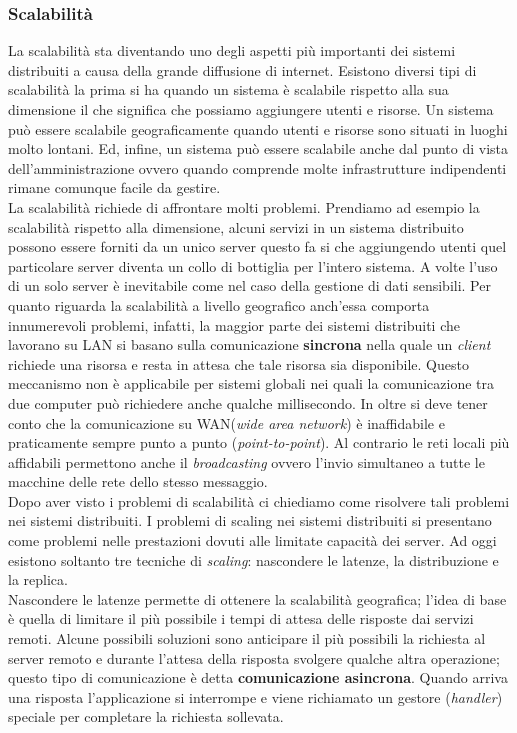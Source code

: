 \subsubsection{Scalabilità}
La scalabilità sta diventando uno degli aspetti più importanti dei sistemi distribuiti a causa della grande diffusione di internet. Esistono diversi tipi di scalabilità la prima si ha quando un sistema è scalabile rispetto alla sua dimensione il che significa che possiamo aggiungere utenti e risorse. Un sistema può essere scalabile geograficamente quando utenti e risorse sono situati in luoghi molto lontani.
Ed, infine, un sistema può essere scalabile anche dal punto di vista dell'amministrazione ovvero quando comprende molte infrastrutture indipendenti rimane comunque facile da gestire.\\
La scalabilità richiede di affrontare molti problemi. Prendiamo ad esempio la scalabilità rispetto alla dimensione, alcuni servizi in un sistema distribuito possono essere forniti da un unico server questo fa si che aggiungendo utenti quel particolare server diventa un collo di bottiglia per l'intero sistema. A volte l'uso di un solo server è inevitabile come nel caso della gestione di dati sensibili.
Per quanto riguarda la scalabilità a livello geografico anch'essa comporta innumerevoli problemi, infatti, la maggior parte dei sistemi distribuiti che lavorano su LAN si basano sulla comunicazione \textbf{sincrona} nella quale un \emph{client} richiede una risorsa e resta in attesa che tale risorsa sia disponibile. Questo meccanismo non è applicabile per sistemi globali nei quali la comunicazione tra due computer può richiedere anche qualche millisecondo. In oltre si deve tener conto che la comunicazione su WAN(\emph{wide area network}) è inaffidabile e praticamente sempre punto a punto (\emph{point-to-point}). Al contrario le reti locali più affidabili permettono anche il \emph{broadcasting} ovvero l'invio simultaneo a tutte le macchine delle rete dello stesso messaggio.\\
Dopo aver visto i problemi di scalabilità ci chiediamo come risolvere tali problemi nei sistemi distribuiti. I problemi di scaling nei sistemi distribuiti si presentano come problemi nelle prestazioni dovuti alle limitate capacità dei server. Ad oggi esistono soltanto tre tecniche di \emph{scaling}: nascondere le latenze, la distribuzione e la replica.\\
Nascondere le latenze permette di ottenere la scalabilità geografica; l'idea di base è quella di limitare il più possibile i tempi di attesa delle risposte dai servizi remoti. Alcune possibili soluzioni sono anticipare il più possibili la richiesta al server remoto e durante l'attesa della risposta svolgere qualche altra operazione; questo tipo di comunicazione è detta \textbf{comunicazione asincrona}. Quando arriva una risposta l'applicazione si interrompe e viene richiamato un gestore (\emph{handler}) speciale per completare la richiesta sollevata.
